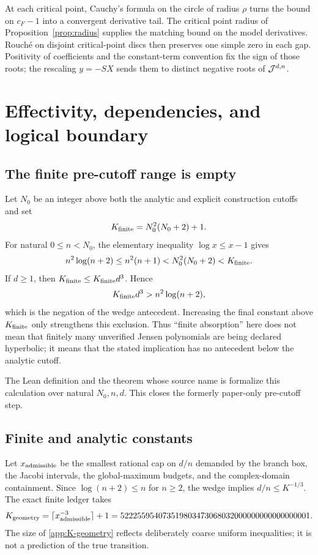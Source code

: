 At each critical point, Cauchy's formula on the circle of radius $\rho$
turns the bound on $c_F-1$ into a convergent derivative tail.  The critical
point radius of Proposition~\ref{prop:radius} supplies the matching bound on
the model derivatives.  Rouch\'e on disjoint critical-point discs then
preserves one simple zero in each gap.  Positivity of coefficients and the
constant-term convention fix the sign of those roots; the rescaling
$y=-SX$ sends them to distinct negative roots of $\mathcal J^{d,n}$.

\section{Effectivity, dependencies, and logical boundary}\label{app:effectivity-details}

\subsection{The finite pre-cutoff range is empty}

Let $N_0$ be an integer above both the analytic and explicit construction
cutoffs and set
\[
 K_{\rm finite}=N_0^2(N_0+2)+1.
\]
For natural $0\le n<N_0$, the elementary inequality
$\log x\le x-1$ gives
\[
 n^2\log(n+2)\le n^2(n+1)<N_0^2(N_0+2)<K_{\rm finite}.
\]
If $d\ge1$, then $K_{\rm finite}\le K_{\rm finite}d^3$.  Hence
\[
 K_{\rm finite}d^3>n^2\log(n+2),
\]
which is the negation of the wedge antecedent.  Increasing the final constant
above $K_{\rm finite}$ only strengthens this exclusion.  Thus ``finite
absorption'' here does not mean that finitely many unverified Jensen
polynomials are being declared hyperbolic; it means that the stated
implication has no antecedent below the analytic cutoff.

The Lean definition  and the theorem
whose source name is 
formalize this calculation over natural
$N_0,n,d$.  This closes the formerly paper-only pre-cutoff step.

\subsection{Finite and analytic constants}

Let $x_{\rm admissible}$ be the smallest rational cap on $d/n$ demanded by
the branch box, the Jacobi intervals, the global-maximum budgets, and the
complex-domain containment.  Since $\log(n+2)\le n$ for $n\ge2$, the wedge
implies $d/n\le K^{-1/3}$.  The exact finite ledger takes
\begin{equation}\label{app:K-geometry}
 K_{\rm geometry}
 =\lceil x_{\rm admissible}^{-3}\rceil+1
 =522255954073519803473068032000000000000000001.
\end{equation}
The size of \eqref{app:K-geometry} reflects deliberately coarse uniform
inequalities; it is not a prediction of the true transition.

